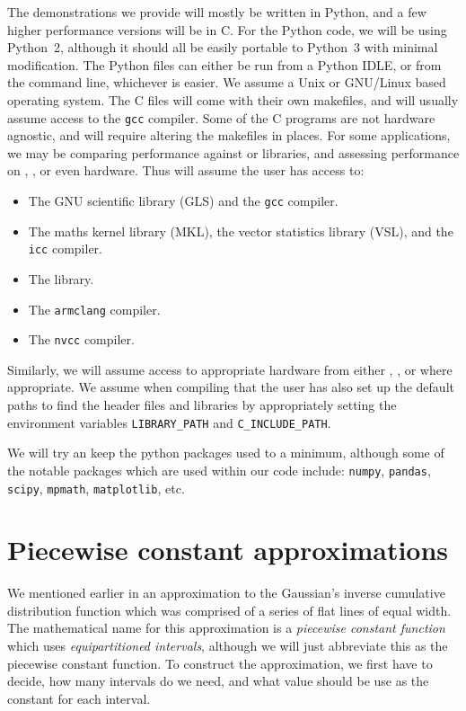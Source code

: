\documentclass[11pt,a4paper,oneside,english]{extarticle}
\begin{document}
The demonstrations we provide will mostly be written in Python, and a few higher performance versions will be in C. For the Python code, we will be using Python~2, although it should all be easily portable to Python~3 with minimal modification. The Python files can either be run from a Python IDLE, or from the command line, whichever is easier. We assume a Unix or GNU/Linux based operating system. The C files will come with their own makefiles, and will usually assume access to the \texttt{gcc} compiler. Some of the C programs are not hardware agnostic, and will require altering the makefiles in places. For some applications, we may be comparing performance against \intel or \nag libraries, and assessing performance on \intel, \arm, or even \nvidia hardware. Thus will assume the user has access to:
\begin{itemize}
\item The GNU scientific library (GLS) and the \texttt{gcc} compiler.
\item The \intel maths kernel library (MKL), the vector statistics library (VSL), and the \texttt{icc} compiler. 
\item The \nag library. 
\item The \arm \texttt{armclang} compiler.
\item The \nvidia \texttt{nvcc} compiler.
\end{itemize} 
Similarly, we will assume access to appropriate hardware from either \intel, \arm, or \nvidia where appropriate. We assume when compiling that the user has also set up the default paths to find the header files and libraries by appropriately setting the environment variables \verb|LIBRARY_PATH| and \verb|C_INCLUDE_PATH|.

We will try an keep the python packages used to a minimum, although some of the notable packages which are used within our code include: \texttt{numpy}, \texttt{pandas}, \texttt{scipy}, \texttt{mpmath}, \texttt{matplotlib}, etc. 

\section{Piecewise constant approximations}

We mentioned earlier in  an approximation to the Gaussian's inverse cumulative distribution function which was comprised of a series of flat lines of equal width. The mathematical name for this approximation is a \emph{piecewise constant function} which uses \emph{equipartitioned intervals}, although we will just abbreviate this as the piecewise constant function. To construct the approximation, we first have to decide, how many intervals do we need, and what value should be use as the constant for each interval. 
\end{document}
